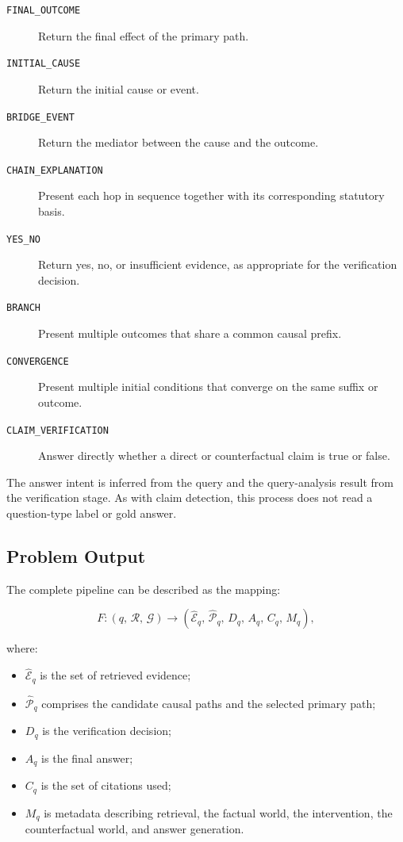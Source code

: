 \begin{description}
    \item[\texttt{FINAL\_OUTCOME}] Return the final effect of the primary
    path.

    \item[\texttt{INITIAL\_CAUSE}] Return the initial cause or event.

    \item[\texttt{BRIDGE\_EVENT}] Return the mediator between the cause and
    the outcome.

    \item[\texttt{CHAIN\_EXPLANATION}] Present each hop in sequence together
    with its corresponding statutory basis.

    \item[\texttt{YES\_NO}] Return yes, no, or insufficient evidence, as
    appropriate for the verification decision.

    \item[\texttt{BRANCH}] Present multiple outcomes that share a common
    causal prefix.

    \item[\texttt{CONVERGENCE}] Present multiple initial conditions that
    converge on the same suffix or outcome.

    \item[\texttt{CLAIM\_VERIFICATION}] Answer directly whether a direct or
    counterfactual claim is true or false.
\end{description}

The answer intent is inferred from the query and the query-analysis result
from the verification stage. As with claim detection, this process does not
read a question-type label or gold answer.

\subsection{Problem Output}

The complete pipeline can be described as the mapping:

\begin{equation}
F:
\left(
    q,\,
    \mathcal{R},\,
    \mathcal{G}
\right)
\longrightarrow
\left(
    \widehat{\mathcal{E}}_q,\,
    \widehat{\mathcal{P}}_q,\,
    D_q,\,
    A_q,\,
    C_q,\,
    M_q
\right),
\end{equation}

where:

\begin{itemize}
    \item \(\widehat{\mathcal{E}}_q\) is the set of retrieved evidence;
    \item \(\widehat{\mathcal{P}}_q\) comprises the candidate causal paths
    and the selected primary path;
    \item \(D_q\) is the verification decision;
    \item \(A_q\) is the final answer;
    \item \(C_q\) is the set of citations used;
    \item \(M_q\) is metadata describing retrieval, the factual world, the
    intervention, the counterfactual world, and answer generation.
\end{itemize}

